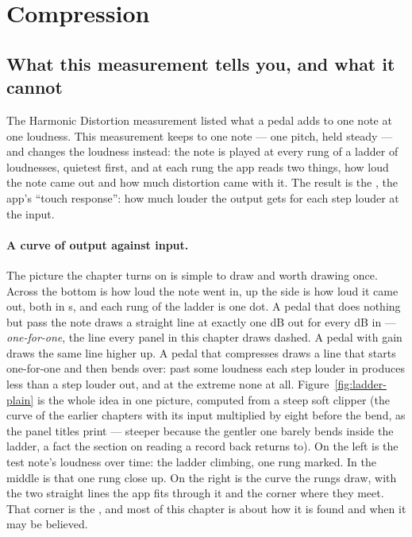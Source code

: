 \documentclass[11pt,a4paper]{article}
\begin{document}
\clearpage
\section{Compression}
\label{sec:compression-plain}

\subsection{What this measurement tells you, and what it cannot}

The Harmonic Distortion measurement listed what a pedal adds to one note
at one loudness. This measurement keeps to one note --- one pitch, held
steady --- and changes the loudness instead: the note is played at every
rung of a ladder of loudnesses, quietest first, and at each rung the app
reads two things, how loud the note came out and how much distortion came
with it. The result is the , the app's ``touch
response'': how much louder the output gets for each step louder at the
input.

\paragraph{A curve of output against input.} The picture the chapter
turns on is simple to draw and worth drawing once. Across the bottom is
how loud the note went in, up the side is how loud it came out, both in
s, and each rung of the ladder is one dot. A pedal that
does nothing but pass the note draws a straight line at exactly one dB
out for every dB in --- \emph{one-for-one}, the line every panel in this
chapter draws dashed. A pedal with gain draws the same line higher up. A
pedal that compresses draws a line that starts one-for-one and then bends
over: past some loudness each step louder in produces less than a step
louder out, and at the extreme none at all. Figure~\ref{fig:ladder-plain}
is the whole idea in one picture, computed from a steep soft clipper (the
 curve of the earlier chapters with its input multiplied by
eight before the bend, as the panel titles print --- steeper because the
gentler one barely bends inside the ladder, a fact the section on reading
a record back returns to). On the left is the test note's loudness over
time: the ladder climbing, one rung marked. In the middle is that one rung
close up. On the right is the curve the rungs draw, with the two straight
lines the app fits through it and the corner where they meet. That corner
is the , and most of this chapter is about how it is found and
when it may be believed.
\end{document}

